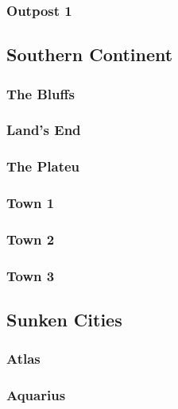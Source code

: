 		\subsubsection{Outpost 1}

	\subsection{Southern Continent}

		\subsubsection{The Bluffs}

		\subsubsection{Land's End}

		\subsubsection{The Plateu}
	
		\subsubsection{Town 1}

		\subsubsection{Town 2}

		\subsubsection{Town 3}

	\subsection{Sunken Cities}

		\subsubsection{Atlas}

		\subsubsection{Aquarius}

